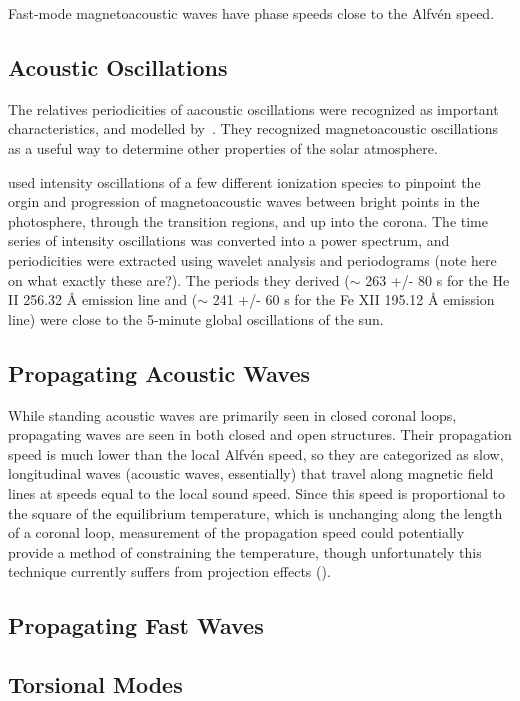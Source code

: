 \documentclass[preprint2]{aastex}
\begin{document}
Fast-mode magnetoacoustic waves have phase speeds close to the Alfv\'en
speed.



\subsection{Acoustic Oscillations}

The relatives periodicities of aacoustic oscillations were recognized
as important characteristics, and modelled by~\cite{acoustic_1}.
They recognized magnetoacoustic oscillations as a useful way to determine
other properties of the solar atmosphere.

\cite{acoustic_2} used intensity oscillations of a few different ionization
species to pinpoint the orgin and progression of magnetoacoustic waves
between bright points in the photosphere, through the transition regions,
and up into the corona. The time series of intensity oscillations was
converted into a power spectrum, and periodicities were extracted using
wavelet analysis and periodograms (note here on what exactly these are?).
The periods they derived
($\sim$ 263 +/- 80 s for the He II 256.32 \AA{} emission line and
($\sim$ 241 +/- 60 s for the Fe XII 195.12 \AA{}  emission line)
were close to the 5-minute global oscillations of the sun.


\subsection{Propagating Acoustic Waves}
While standing acoustic waves are primarily seen in closed coronal
loops, propagating waves are seen in both closed and open structures.
Their propagation speed is much lower than the local Alfv\'en speed,
so they are categorized as slow, longitudinal waves (acoustic waves,
essentially) that travel along magnetic field lines at speeds equal to
the local sound speed.
Since this speed is proportional to the square of the equilibrium temperature,
which is unchanging along the length of a coronal loop, measurement of the
propagation speed could potentially provide a method of constraining the
temperature, though unfortunately this technique currently suffers from
projection effects
(\cite{Nak}).

\subsection{Propagating Fast Waves}

\subsection{Torsional Modes}
\end{document}
